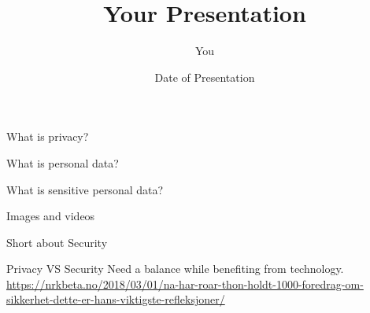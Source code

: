 \documentclass{beamer}
\title[Your Short Title]{Your Presentation}
\author{You}
\institute{Where You're From}
\date{Date of Presentation}
\begin{document}
\begin{frame}
  \titlepage
\end{frame}




%



\begin{frame}{What is privacy?}

\end{frame}


\begin{frame}{What is personal data?}

\end{frame}


\begin{frame}{What is sensitive personal data?}

\end{frame}


\begin{frame}{Images and videos}

\end{frame}

\begin{frame}{Short about Security}

\end{frame}


\begin{frame}{Privacy VS Security}
Need a balance while benefiting from technology.
\url{https://nrkbeta.no/2018/03/01/na-har-roar-thon-holdt-1000-foredrag-om-sikkerhet-dette-er-hans-viktigste-refleksjoner/}
\end{frame}
\end{document}
